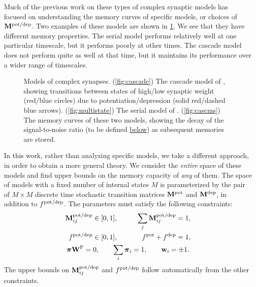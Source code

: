 Much of the previous work on these types of complex synaptic models has focused on understanding the memory curves of specific models, or choices of $\mathbf{M}^{\text{pot/dep}}$.
Two examples of these models are shown in \cref{fig:models}. We see that they have different memory properties.
The serial model performs relatively well at one particular timescale, but it performs poorly at other times.
The cascade model does not perform quite as well at that time, but it maintains its performance over a wider range of timescales.

\begin{figure}[tbp]
 \begin{center}
 \begin{myenuma}
  \label{fig:cascade}
  \label{fig:multistate}
  \label{fig:cascms}
 \end{myenuma}
 \end{center}
  \caption[Models of complex synapses]{Models of complex synapses.
  (\ref{fig:cascade}) The cascade model of \cite{Fusi2005cascade}, showing transitions between states of high/low synaptic weight (red/blue circles) due to potentiation/depression (solid red/dashed blue arrows).
  (\ref{fig:multistate}) The serial model of \cite{Leibold2008serial}.
  (\ref{fig:cascms}) The memory curves of these two models, showing the decay of the signal-to-noise ratio (to be defined \hyperref[sec:setup]{below}) as subsequent memories are stored.
  \label{fig:models}}
\end{figure}


In this work, rather than analyzing specific models,  we take a different approach, in order to obtain a more general theory.
We consider the \emph{entire} space of these models and find upper bounds on the memory capacity of \emph{any} of them.
The space of models with a fixed number of internal states $M$ is parameterized by the pair of $M \times M$ discrete time stochastic
transition matrices $\mathbf{M}^{\text{pot}}$ and $\mathbf{M}^{\text{dep}}$, in addition to $f^{\text{pot/dep}}$.  The parameters must satisfy the following constraints:
%
\begin{equation}\label{eq:constr}
\begin{gathered}
\begin{aligned}
  \mathbf{M}^{\text{pot/dep}}_{ij} &\in [0,1], &\qquad
  \sum_j \mathbf{M}^{\text{pot/dep}}_{ij} &= 1, \\
  f^{\text{pot/dep}} &\in [0,1],&
  f^{\text{pot}} + f^{\text{dep}} &= 1,
\end{aligned}
\\
  \boldsymbol{\pi}\mathbf{W}^{\mathrm{F}} = 0, \qquad
  \sum_i \boldsymbol{\pi}_i = 1, \qquad
  \mathbf{w}_i = \pm 1.
\end{gathered}
\end{equation}
%
The upper bounds on $\mathbf{M}^{\text{pot/dep}}_{ij}$ and $f^{\text{pot/dep}}$ follow automatically from the other constraints.

